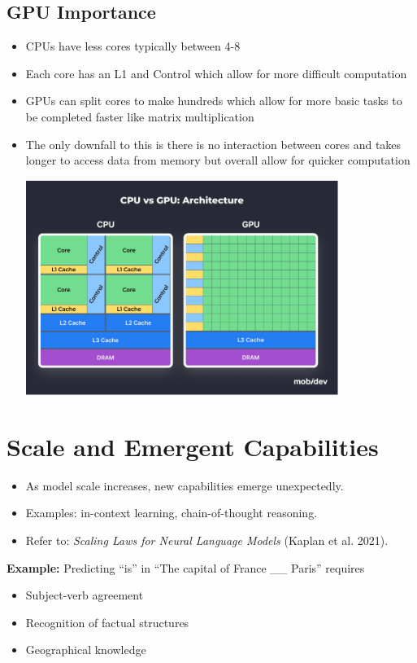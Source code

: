 \documentclass[11pt]{article}
\begin{document}
\subsection*{GPU Importance}
\begin{itemize}
    \item CPUs have less cores typically between 4-8
    \item Each core has an L1 and Control which allow for more difficult computation
    \item GPUs can split cores to make hundreds which allow for more basic tasks to be completed faster like matrix multiplication
    \item The only downfall to this is there is no interaction between cores and takes longer to access data from memory but overall allow for quicker computation
    
    \includegraphics[width=0.8\textwidth]{notesimage1.PNG}
\end{itemize}

\section{Scale and Emergent Capabilities}
\begin{itemize}
    \item As model scale increases, new capabilities emerge unexpectedly.
    \item Examples: in-context learning, chain-of-thought reasoning.
    \item Refer to: \textit{Scaling Laws for Neural Language Models} (Kaplan et al. 2021).
\end{itemize}

\begin{tcolorbox}
\textbf{Example:} Predicting ``is'' in ``The capital of France \_\_ Paris'' requires
\begin{itemize}
    \item Subject-verb agreement
    \item Recognition of factual structures
    \item Geographical knowledge
\end{itemize}
\end{tcolorbox}
\end{document}
